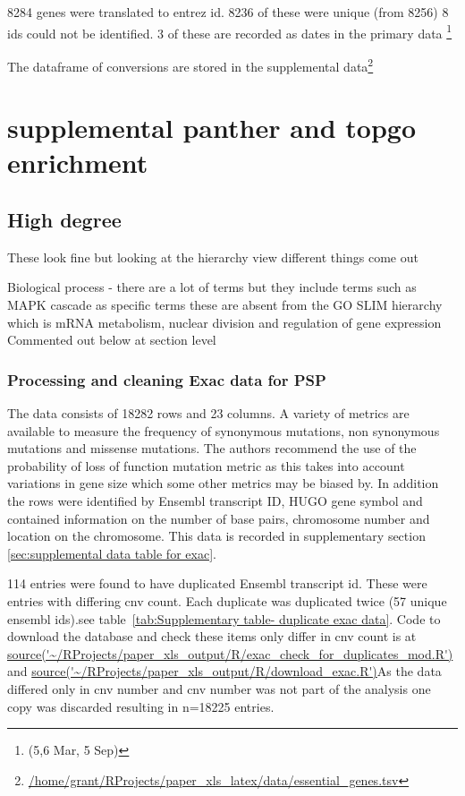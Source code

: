 8284 genes were translated to entrez id. 8236 of these were unique (from 8256) 8 ids could not be identified. 3 of these are recorded as dates in the primary data \footnote{(5,6 Mar, 5 Sep)}
 
 The dataframe of conversions are stored in the supplemental data\footnote{ \url{/home/grant/RProjects/paper_xls_latex/data/essential_genes.tsv}}
 
 
\section{supplemental panther and topgo enrichment}
\subsection{High degree}
These look fine but looking at the hierarchy view different things come out

Biological process - there are a lot of terms but they include terms such as MAPK cascade as specific terms these are absent from the GO SLIM hierarchy which is mRNA metabolism, nuclear division and regulation of gene expression
Commented out below at section level
\subsubsection{Processing and cleaning Exac data for PSP}
The data consists of 18282 rows and 23 columns. A variety of metrics are available to measure the frequency of synonymous mutations, non synonymous mutations and missense mutations. The authors recommend the use of the probability of loss of function mutation metric as this takes into account variations in gene size which some other metrics may be biased by. In addition the rows were identified by Ensembl transcript ID, HUGO gene symbol and contained information on the number of base pairs, chromosome number and location on the chromosome. This data is recorded in supplementary section~
\ref{sec:supplemental data table for exac}.


114 entries were found to have duplicated Ensembl transcript id. These were entries with differing cnv count. Each duplicate was duplicated twice (57 unique ensembl ids).see table~\ref{tab:Supplementary table- duplicate exac data}. Code to download the database and check these items only differ in cnv count is at \url{source('~/RProjects/paper_xls_output/R/exac_check_for_duplicates_mod.R')} and
\url{source('~/RProjects/paper_xls_output/R/download_exac.R')}As the data differed only in cnv number and cnv number was not part of the analysis one copy was discarded resulting in n=18225 entries. 

